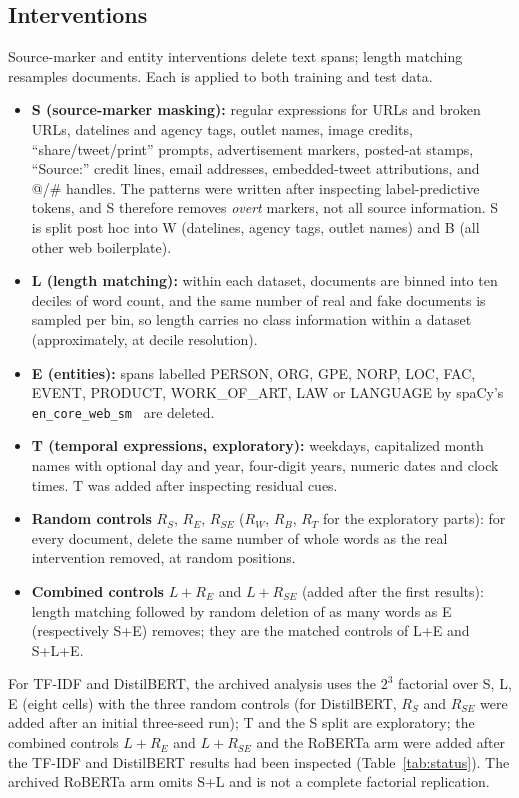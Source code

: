 \subsection{Interventions}
Source-marker and entity interventions delete text spans; length matching resamples documents. Each is applied to both training and test data.
\begin{itemize}
\item \textbf{S (source-marker masking):} regular expressions for URLs and broken URLs, datelines and agency tags, outlet names, image credits, ``share/tweet/print'' prompts, advertisement markers, posted-at stamps, ``Source:'' credit lines, email addresses, embedded-tweet attributions, and @/\# handles. The patterns were written after inspecting label-predictive tokens, and S therefore removes \emph{overt} markers, not all source information. S is split post hoc into W (datelines, agency tags, outlet names) and B (all other web boilerplate).
\item \textbf{L (length matching):} within each dataset, documents are binned into ten deciles of word count, and the same number of real and fake documents is sampled per bin, so length carries no class information within a dataset (approximately, at decile resolution).
\item \textbf{E (entities):} spans labelled PERSON, ORG, GPE, NORP, LOC, FAC, EVENT, PRODUCT, WORK\_OF\_ART, LAW or LANGUAGE by spaCy's \texttt{en\_core\_web\_sm}~\cite{honnibal2020spacy} are deleted.
\item \textbf{T (temporal expressions, exploratory):} weekdays, capitalized month names with optional day and year, four-digit years, numeric dates and clock times. T was added after inspecting residual cues.
\item \textbf{Random controls} $R_S$, $R_E$, $R_{SE}$ ($R_W$, $R_B$, $R_T$ for the exploratory parts): for every document, delete the same number of whole words as the real intervention removed, at random positions.
\item \textbf{Combined controls} $L{+}R_E$ and $L{+}R_{SE}$ (added after the first results): length matching followed by random deletion of as many words as E (respectively S+E) removes; they are the matched controls of L+E and S+L+E.
\end{itemize}
For TF-IDF and DistilBERT, the archived analysis uses the $2^3$ factorial over S, L, E (eight cells) with the three random controls (for DistilBERT, $R_S$ and $R_{SE}$ were added after an initial three-seed run); T and the S split are exploratory; the combined controls $L{+}R_E$ and $L{+}R_{SE}$ and the RoBERTa arm were added after the TF-IDF and DistilBERT results had been inspected (Table~\ref{tab:status}). The archived RoBERTa arm omits S+L and is not a complete factorial replication.

